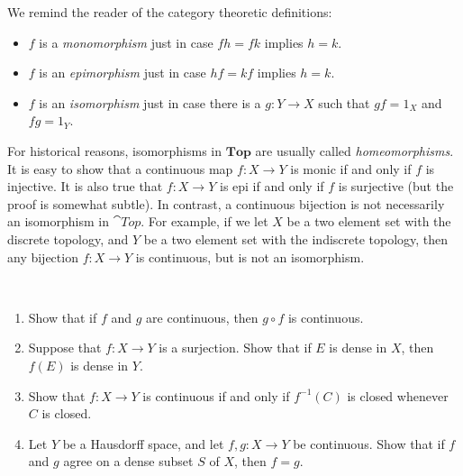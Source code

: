 We remind the reader of the category theoretic definitions:
\begin{itemize}
\item $f$ is a \emph{monomorphism} just in case $fh=fk$ implies $h=k$.
\item $f$ is an \emph{epimorphism} just in case $hf=kf$ implies $h=k$.
\item $f$ is an \emph{isomorphism} just in case there is a $g:Y\to X$
  such that $gf=1_X$ and $fg=1_Y$.
\end{itemize} For historical reasons, isomorphisms in $\mathbf{Top}$
are usually called \emph{homeomorphisms}.  It is easy to show that a
continuous map $f:X\to Y$ is monic if and only if $f$ is injective.
It is also true that $f:X\to Y$ is epi if and only if $f$ is
surjective (but the proof is somewhat subtle).  In contrast, a
continuous bijection is not necessarily an isomorphism in $\cat{Top}$.
For example, if we let $X$ be a two element set with the discrete
topology, and $Y$ be a two element set with the indiscrete topology,
then any bijection $f:X\to Y$ is continuous, but is not an
isomorphism.







\begin{exercise} \mbox{ } 
\begin{enumerate}
\item Show that if $f$ and $g$ are continuous, then $g\circ f$ is
continuous.
\item Suppose that $f:X\to Y$ is a surjection.  Show that if $E$ is
  dense in $X$, then $f(E)$ is dense in $Y$.
\item Show that $f:X\to Y$ is continuous if and only if $f^{-1}(C)$ is
  closed whenever $C$ is closed.
\item Let $Y$ be a Hausdorff space, and let $f,g:X\to Y$ be
  continuous.  Show that if $f$ and $g$ agree on a dense subset $S$ of
  $X$, then $f=g$.
\end{enumerate} \end{exercise}

